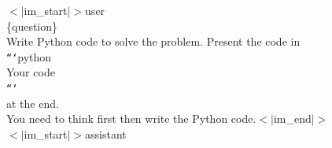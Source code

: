 \begin{prompt}[title={Training and Evaluation Prompt Template for Code Generation}]
\label{prompt: qwen3 code}
$<|$im\_start$|>$user
\\
\{question\}
\\
Write Python code to solve the problem. Present the code in 
\\
\texttt{```}python
\\
Your code
\\
\texttt{```}
\\
at the end.
\\
You need to think first then write the Python code.$<|$im\_end$|>$
\\
$<|$im\_start$|>$assistant
\end{prompt}
